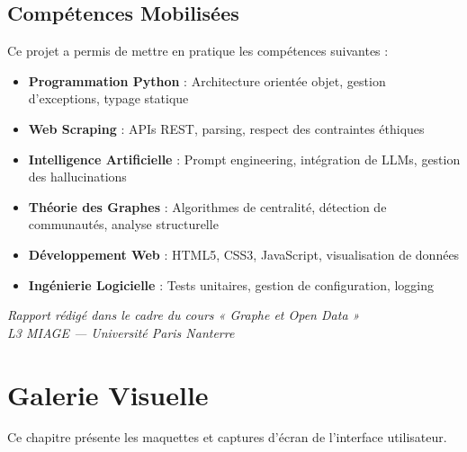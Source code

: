 \documentclass[12pt,a4paper]{report}
\begin{document}
\section{Compétences Mobilisées}

Ce projet a permis de mettre en pratique les compétences suivantes :

\begin{itemize}
    \item \textbf{Programmation Python} : Architecture orientée objet, gestion d'exceptions, typage statique
    \item \textbf{Web Scraping} : APIs REST, parsing, respect des contraintes éthiques
    \item \textbf{Intelligence Artificielle} : Prompt engineering, intégration de LLMs, gestion des hallucinations
    \item \textbf{Théorie des Graphes} : Algorithmes de centralité, détection de communautés, analyse structurelle
    \item \textbf{Développement Web} : HTML5, CSS3, JavaScript, visualisation de données
    \item \textbf{Ingénierie Logicielle} : Tests unitaires, gestion de configuration, logging
\end{itemize}

\vspace{1cm}

\begin{center}

\vspace{0.5cm}
\textit{Rapport rédigé dans le cadre du cours « Graphe et Open Data »}\\
\textit{L3 MIAGE — Université Paris Nanterre}
\end{center}

\appendix
\chapter{Galerie Visuelle}

Ce chapitre présente les maquettes et captures d'écran de l'interface utilisateur.
\end{document}
